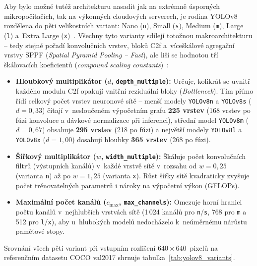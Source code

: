 Aby bylo možné tutéž architekturu nasadit jak na extrémně úsporných mikropočítačích, tak na výkonných cloudových serverech, je rodina YOLOv8 rozdělena do pěti velikostních variant: Nano (\texttt{n}), Small (\texttt{s}), Medium (\texttt{m}), Large (\texttt{l}) a~Extra Large (\texttt{x})~\cite{ultralytics_yolov8_docs}. Všechny tyto varianty sdílejí totožnou makroarchitekturu – tedy stejné pořadí konvolučních vrstev, bloků C2f a~víceškálové agregační vrstvy SPPF (\textit{Spatial Pyramid Pooling -- Fast}), ale liší se hodnotou tří škálovacích koeficientů (\textit{compound scaling constants})~\cite{terven_yolo_review_2023, ultralytics_yolov8_docs}:
\begin{itemize}
    \item \textbf{Hloubkový multiplikátor ($d$, \texttt{depth\_multiple}):} Určuje, kolikrát se uvnitř každého modulu C2f opakují vnitřní reziduální bloky (\textit{Bottleneck}). Tím přímo řídí celkový počet vrstev neuronové sítě – menší modely \texttt{YOLOv8n} a \texttt{YOLOv8s} ($d=0{,}33$) čítají v~nesloučeném výpočetním grafu \textbf{225 vrstev} (168 vrstev po fúzi konvoluce a dávkové normalizace při inferenci), střední model \texttt{YOLOv8m} ($d=0{,}67$) obsahuje \textbf{295 vrstev} (218 po fúzi) a největší modely \texttt{YOLOv8l} a \texttt{YOLOv8x} ($d=1{,}00$) dosahují hloubky \textbf{365 vrstev} (268 po fúzi).
    \item \textbf{Šířkový multiplikátor ($w$, \texttt{width\_multiple}):} Škáluje počet konvolučních filtrů (výstupních kanálů) v~každé vrstvě sítě v~rozsahu od $w=0{,}25$ (varianta \texttt{n}) až po $w=1{,}25$ (varianta \texttt{x}). Růst šířky sítě kvadraticky zvyšuje počet trénovatelných parametrů i nároky na výpočetní výkon (\acs{GFLOPs}).
    \item \textbf{Maximální počet kanálů ($c_{\max}$, \texttt{max\_channels}):} Omezuje horní hranici počtu kanálů v~nejhlubších vrstvách sítě (1\,024 kanálů pro \texttt{n}/\texttt{s}, 768 pro \texttt{m} a 512 pro \texttt{l}/\texttt{x}), aby u~hlubokých modelů nedocházelo k~neúměrnému nárůstu paměťové stopy.
\end{itemize}

Srovnání všech pěti variant při vstupním rozlišení $640 \times 640$~pixelů na referenčním datasetu COCO val2017 shrnuje tabulka~\ref{tab:yolov8_variants}.

